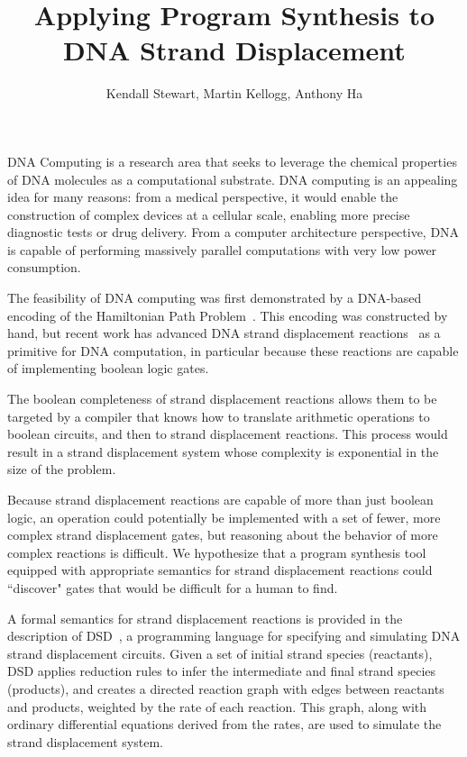 \documentclass{article}
\begin{document}
\title{Applying Program Synthesis to DNA Strand Displacement}
\author{Kendall Stewart, Martin Kellogg, Anthony Ha}

\maketitle

DNA Computing is a research area that seeks to leverage the chemical properties
of DNA molecules as a computational substrate. DNA computing is an appealing
idea for many reasons: from a medical perspective, it would enable the
construction of complex devices at a cellular scale, enabling more precise
diagnostic tests or drug delivery. From a computer architecture perspective,
DNA is capable of performing massively parallel computations with very low
power consumption.

The feasibility of DNA computing was first demonstrated by a DNA-based encoding
of the Hamiltonian Path Problem~\cite{adelman}. This encoding was constructed by
hand, but recent work has advanced DNA strand displacement
reactions~\cite{strands} as a primitive for DNA computation, in particular
because these reactions are capable of implementing boolean logic gates.

The boolean completeness of strand displacement reactions allows them to be
targeted by a compiler that knows how to translate arithmetic operations to
boolean circuits, and then to strand displacement reactions. This process would
result in a strand displacement system whose complexity is exponential in the
size of the problem.

Because strand displacement reactions are capable of more than just boolean
logic, an operation could potentially be implemented with a set of fewer, more
complex strand displacement gates, but reasoning about the behavior of more
complex reactions is difficult. We hypothesize that a program synthesis tool
equipped with appropriate semantics for strand displacement reactions could
``discover" gates that would be difficult for a human to find.

A formal semantics for strand displacement reactions is provided in the
description of DSD~\cite{dsd}, a programming language for specifying and
simulating DNA strand displacement circuits. Given a set of initial strand
species (reactants), DSD applies reduction rules to infer the intermediate and
final strand species (products), and creates a directed reaction graph with
edges between reactants and products, weighted by the rate of each reaction.
This graph, along with ordinary differential equations derived from the rates,
are used to simulate the strand displacement system.
\end{document}
